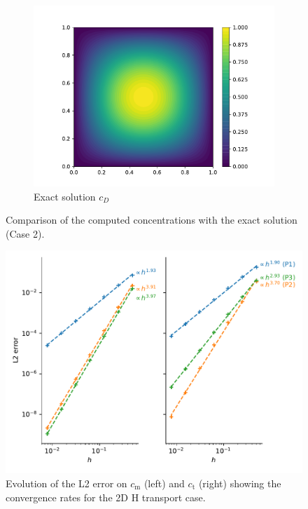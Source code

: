 \begin{figure}
\begin{subfigure}{0.3\linewidth}
        \includegraphics[width=\linewidth]{Figures/Chapter2/c_exact.pdf}
        \caption{Exact solution $c_D$}
    \end{subfigure}
    \caption{Comparison of the computed concentrations with the exact solution (Case 2).}
    \label{fig: results MMS 2D H transport}
\end{figure}

\begin{figure}
    \centering
    \includegraphics[width=\linewidth]{Figures/Chapter2/convergence_rate_H.pdf}
    \caption{Evolution of the L2 error on $c_\mathrm{m}$ (left) and $c_\mathrm{t}$ (right) showing the convergence rates for the 2D H transport case.}
    \label{fig: convergence rates H}
\end{figure}
